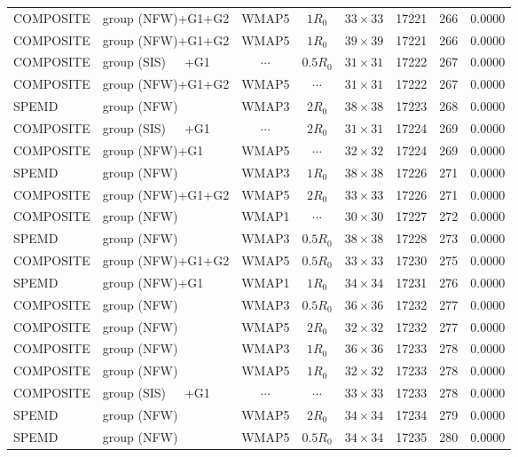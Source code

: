 \documentclass[useAMS,usenatbib]{mnras}
\def\nomicro{$\cdots$}
\def\nodata{$\cdots$}
\begin{document}
\begin{table}
\begin{tabular}{llccccrr}
        COMPOSITE & group (NFW)+G1+G2 &WMAP5 & $1R_{0}$&$33\times33$ & 17221 & 266 & 0.0000\\
        COMPOSITE & group (NFW)+G1+G2 &WMAP5 & $1R_{0}$&$39\times39$ & 17221 & 266 & 0.0000\\
        COMPOSITE & group (SIS)~~~+G1 &\nodata& $0.5R_{0}$&$31\times31$ & 17222 & 267 & 0.0000\\
        COMPOSITE & group (NFW)+G1+G2 &WMAP5 & \nomicro&$31\times31$ & 17222 & 267 & 0.0000\\
        SPEMD     & group (NFW)       &WMAP3 & $2R_{0}$&$38\times38$ & 17223 & 268 & 0.0000\\
        COMPOSITE & group (SIS)~~~+G1 &\nodata   & $2R_{0}$&$31\times31$ & 17224 & 269 & 0.0000\\
        COMPOSITE & group (NFW)+G1    &WMAP5 & \nomicro&$32\times32$ & 17224 & 269 & 0.0000\\
        SPEMD     & group (NFW)       &WMAP3 & $1R_{0}$&$38\times38$ & 17226 & 271 & 0.0000\\
        COMPOSITE & group (NFW)+G1+G2 &WMAP5 & $2R_{0}$&$33\times33$ & 17226 & 271 & 0.0000\\
        COMPOSITE & group (NFW)       &WMAP1 & \nomicro&$30\times30$   & 17227 & 272 & 0.0000\\
        SPEMD     & group (NFW)       &WMAP3 & $0.5R_{0}$&$38\times38$ & 17228 & 273 & 0.0000\\
        COMPOSITE & group (NFW)+G1+G2 &WMAP5 & $0.5R_{0}$&$33\times33$ & 17230 & 275 & 0.0000\\
        SPEMD     & group (NFW)+G1    &WMAP1 & $1R_{0}$&$34\times34$ & 17231 & 276 & 0.0000\\
        COMPOSITE & group (NFW)       &WMAP3 & $0.5R_{0}$&$36\times36$ & 17232 & 277 & 0.0000\\
        COMPOSITE & group (NFW)       &WMAP5 & $2R_{0}$&$32\times32$   & 17232 & 277 & 0.0000\\
        COMPOSITE & group (NFW)       &WMAP3 & $1R_{0}$&$36\times36$   & 17233 & 278 & 0.0000\\
        COMPOSITE & group (NFW)       &WMAP5 & $1R_{0}$&$32\times32$ & 17233 & 278 & 0.0000\\
        COMPOSITE & group (SIS)~~~+G1 &\nodata& \nomicro&$33\times33$   & 17233 & 278 & 0.0000\\
        SPEMD     & group (NFW)       &WMAP5 & $2R_{0}$&$34\times34$ & 17234 & 279 & 0.0000\\
        SPEMD     & group (NFW)       &WMAP5 & $0.5R_{0}$&$34\times34$ & 17235 & 280 & 0.0000\\

\end{tabular}
\end{table}
\end{document}
